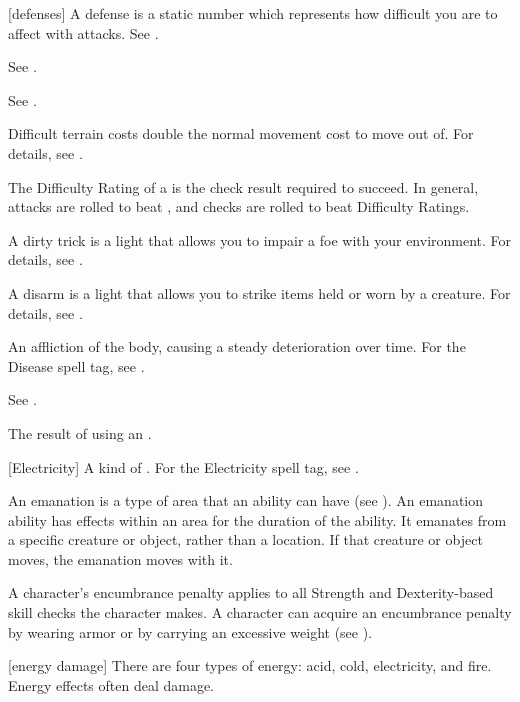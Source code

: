 [defenses] A defense is a static number which represents how difficult you are to affect with attacks. See .

 See .

 See .

 Difficult terrain costs double the normal movement cost to move out of.
For details, see .

 The Difficulty Rating of a  is the check result required to succeed.
In general, attacks are rolled to beat , and checks are rolled to beat Difficulty Ratings.

 A dirty trick is a light  that allows you to impair a foe with your environment.
For details, see .

 A disarm is a light  that allows you to strike items held or worn by a creature.
For details, see .

 An affliction of the body, causing a steady deterioration over time. For the Disease spell tag, see .

 See .

 The result of using an .

[Electricity] A kind of . For the Electricity spell tag, see .

 An emanation is a type of area that an ability can have (see ).
An emanation ability has effects within an area for the duration of the ability.
It emanates from a specific creature or object, rather than a location.
If that creature or object moves, the emanation moves with it.

 A character's encumbrance penalty applies to all Strength and Dexterity-based skill checks the character makes.
A character can acquire an encumbrance penalty by wearing armor or by carrying an excessive weight (see ).

[energy damage] There are four types of energy: acid, cold, electricity, and fire. Energy effects often deal damage.


